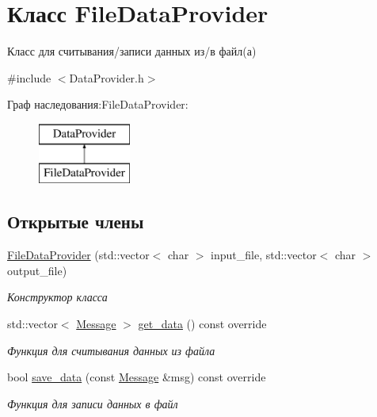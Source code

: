 \hypertarget{class_file_data_provider}{}\section{Класс File\+Data\+Provider}
\label{class_file_data_provider}


Класс для считывания/записи данных из/в файл(а)  




{\ttfamily \#include $<$Data\+Provider.\+h$>$}

Граф наследования\+:File\+Data\+Provider\+:\begin{figure}[H]
\begin{center}
\leavevmode
\includegraphics[height=2.000000cm]{class_file_data_provider}
\end{center}
\end{figure}
\subsection*{Открытые члены}
\begin{DoxyCompactItemize}
\item 
\mbox{\hyperlink{class_file_data_provider_a993b0c05a33d57eeb96c9269fc4479a5}{File\+Data\+Provider}} (std\+::vector$<$ char $>$ input\+\_\+file, std\+::vector$<$ char $>$ output\+\_\+file)
\begin{DoxyCompactList}\small\item\em Конструктор класса \end{DoxyCompactList}\item 
std\+::vector$<$ \mbox{\hyperlink{class_message}{Message}} $>$ \mbox{\hyperlink{class_file_data_provider_a3804f90fbca39fb9d9fa62389152a1a5}{get\+\_\+data}} () const override
\begin{DoxyCompactList}\small\item\em Функция для считывания данных из файла \end{DoxyCompactList}\item 
bool \mbox{\hyperlink{class_file_data_provider_aff73a92f2e079094d7b0b0c9829b1ead}{save\+\_\+data}} (const \mbox{\hyperlink{class_message}{Message}} \&msg) const override
\begin{DoxyCompactList}\small\item\em Функция для записи данных в файл \end{DoxyCompactList}\end{DoxyCompactItemize}


